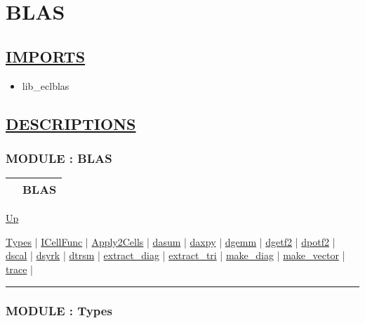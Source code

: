 \chapter*{BLAS}
\hypertarget{ecldoc:toc:BLAS}{}

\section*{\underline{IMPORTS}}
\begin{itemize}
\item lib\_eclblas
\end{itemize}

\section*{\underline{DESCRIPTIONS}}
\subsection*{MODULE : BLAS}
\hypertarget{ecldoc:BLAS}{}

{\renewcommand{\arraystretch}{1.5}
\begin{tabularx}{\textwidth}{|>{\raggedright\arraybackslash}l|X|}
\hline
\hspace{0pt} & BLAS \\
\hline
\end{tabularx}
}

\hyperlink{ecldoc:toc:root}{Up}

\par


\hyperlink{ecldoc:BLAS.Types}{Types}  |
\hyperlink{ecldoc:blas.icellfunc}{ICellFunc}  |
\hyperlink{ecldoc:blas.apply2cells}{Apply2Cells}  |
\hyperlink{ecldoc:blas.dasum}{dasum}  |
\hyperlink{ecldoc:blas.daxpy}{daxpy}  |
\hyperlink{ecldoc:blas.dgemm}{dgemm}  |
\hyperlink{ecldoc:blas.dgetf2}{dgetf2}  |
\hyperlink{ecldoc:blas.dpotf2}{dpotf2}  |
\hyperlink{ecldoc:blas.dscal}{dscal}  |
\hyperlink{ecldoc:blas.dsyrk}{dsyrk}  |
\hyperlink{ecldoc:blas.dtrsm}{dtrsm}  |
\hyperlink{ecldoc:blas.extract_diag}{extract\_diag}  |
\hyperlink{ecldoc:blas.extract_tri}{extract\_tri}  |
\hyperlink{ecldoc:blas.make_diag}{make\_diag}  |
\hyperlink{ecldoc:blas.make_vector}{make\_vector}  |
\hyperlink{ecldoc:blas.trace}{trace}  |

\rule{\textwidth}{0.4pt}

\subsection*{MODULE : Types}
\hypertarget{ecldoc:BLAS.Types}{}

